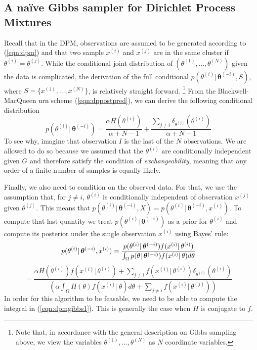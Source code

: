 \documentclass[final,3p,times,twocolumn]{elsarticle}
\let\bs\boldsymbol
\begin{document}
\subsection{A na{\"i}ve Gibbs sampler for Dirichlet Process Mixtures}
Recall that in the DPM, observations are assumed to be generated according to (\ref{eqn:dpm}) and that two sample $x^{(i)}$ and $x^{(j)}$ are in the same cluster if $\theta^{(i)}=\theta^{(j)}$.
While the conditional joint distribution of $(\theta^{(1)},\dots,\theta^{(N)})$ given the data is complicated, the derivation of the full conditional $p(\theta^{(i)}|\,\bs\theta^{(-i)},S)$, where $S=\{x^{(1)},\dots,x^{(N)}\}$, is relatively straight forward.
\footnote{Note that, in accordance with the general description on Gibbs sampling above, we view the variables $\theta^{(1)},\dots,\theta^{(N)}$ as $N$ coordinate variables.}
From the Blackwell-MacQueen urn scheme (\ref{eqn:dppostpred}), we can derive the following conditional distribution
\begin{equation}
\label{eqn:dpmpostpred}
p(\theta^{(i)}|\,\bs\theta^{(-i)}) = \frac{\alpha H(\theta^{(i)})}{\alpha+N-1} +\frac{\sum_{j\neq i}\delta_{\theta^{(j)}}(\theta^{(i)})}{\alpha+N-1}
\end{equation}
To see why, imagine that observation $I$ is the last of the $N$ observations.
We are allowed to do so because we assumed that the $\theta^{(i)}$ are conditionally independent given $G$ and therefore satisfy the condition of \emph{exchangeability}, meaning that any order of a finite number of samples is equally likely.

Finally, we also need to condition on the observed data.
For that, we use the assumption that, for $j\neq i$, $\theta^{(i)}$ is conditionally independent of observation $x^{(j)}$ given $\theta^{(j)}$.
This means that $p(\theta^{(i)}|\,\bs\theta^{(-i)},X) = p(\theta^{(i)}|\,\bs\theta^{(-i)},x^{(i)})$.
To compute that last quantity we treat $p(\theta^{(i)}|\,\bs\theta^{(-i)})$ as a prior for $\theta^{(i)}$ and compute its posterior under the single observation $x^{(i)}$ using Bayes' rule:
\begin{equation}
\label{eqn:dpmgibbs1}
p(\theta^{(i)}|\,\bs\theta^{(-i)},x^{(i)}) = \frac{p(\theta^{(i)}|\,\bs\theta^{(-i)})f(x^{(i)}|\,\theta^{(i)})}{\int_\Omega p(\theta|\,\bs\theta^{(-i)})f(x^{(i)}|\,\theta) d\theta}\\
\end{equation}
\begin{equation*}
=\frac{\alpha H(\theta^{(i)})f(x^{(i)}|\,\theta^{(i)}) + \sum_{j\neq i}f(x^{(i)}|\,\theta^{(i)})\delta_{\theta^{(j)}}(\theta^{(i)})}{\left(\alpha\int_\Omega H(\theta)f(x^{(i)}|\,\theta)d\theta+\sum_{j \neq i}f(x^{(i)}|\,\theta^{(j)})\right)}
\end{equation*}
In order for this algorithm to be feasable, we need to be able to compute the integral in (\ref{eqn:dpmgibbs1}).
This is generally the case when $H$ is conjugate to $f$.
\end{document}
